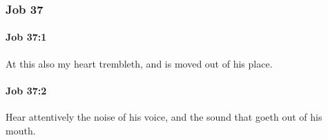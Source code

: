 	\subsubsection{Job 37} %
		\label{JOB-37}

		\paragraph{Job 37:1} %
			\label{JOB-37-1}

			At this also my heart trembleth, and is moved out of his place.


		\paragraph{Job 37:2} %
			\label{JOB-37-2}

			Hear attentively the noise of his voice, and the sound that goeth out of his mouth.

